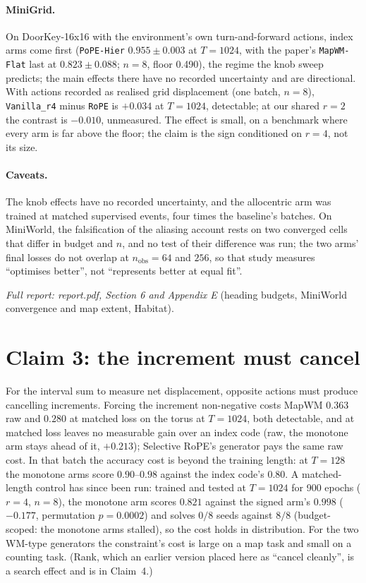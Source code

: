 \documentclass[10pt]{article}
\newcommand{\arm}[1]{\texttt{#1}}
\begin{document}
\paragraph{MiniGrid.} On DoorKey-16x16 with the environment's own turn-and-forward actions, index arms come first
(\arm{PoPE-Hier} $0.955\pm0.003$ at $T=1024$, with the paper's \arm{MapWM-Flat} last at $0.823\pm0.088$; $n=8$,
floor 0.490), the regime the knob sweep predicts; the main effects there have no recorded uncertainty and are directional.
With actions recorded as realised grid displacement (one batch, $n=8$), \arm{Vanilla\_r4} minus \arm{RoPE} is
$+0.034$ at $T=1024$, detectable; at our shared $r=2$ the contrast is $-0.010$, unmeasured. The effect is small, on a benchmark where every arm is far above the floor; the claim is the sign
conditioned on $r=4$, not its size.

\paragraph{Caveats.} The knob effects have no recorded uncertainty, and the allocentric arm was trained at matched
supervised events, four times the baseline's batches. On MiniWorld, the falsification of the aliasing account
rests on two converged cells that differ in budget and $n$, and no test of their difference was run; the two arms'
final losses do not overlap at $n_{\mathrm{obs}}=64$ and $256$, so that study measures ``optimises better'', not
``represents better at equal fit''.

\noindent\emph{Full report: report.pdf, Section 6 and Appendix E} (heading budgets, MiniWorld convergence and
map extent, Habitat).

\section{Claim 3: the increment must cancel}
\label{sec:claim3}

For the interval sum to measure net displacement, opposite actions must produce cancelling increments. Forcing the increment non-negative costs MapWM $0.363$ raw and
$0.280$ at matched loss on the torus at $T=1024$, both detectable, and at matched loss leaves no measurable gain over
an index code (raw, the monotone arm stays ahead of it, $+0.213$); Selective RoPE's generator pays the same raw cost.
In that batch the accuracy cost is beyond the training length: at $T=128$ the monotone arms score $0.90$--$0.98$ against the index
code's $0.80$. A matched-length control has since been run: trained and tested at $T=1024$ for 900 epochs ($r=4$,
$n=8$), the monotone arm scores $0.821$ against the signed arm's $0.998$ ($-0.177$, permutation $p=0.0002$) and
solves $0/8$ seeds against $8/8$ (budget-scoped: the monotone arms stalled), so the cost holds in distribution. For the two WM-type
generators the constraint's cost is large on a map task and small on a counting task. (Rank, which an earlier
version placed here as ``cancel cleanly'', is a search effect and is in Claim~4.)
\end{document}
